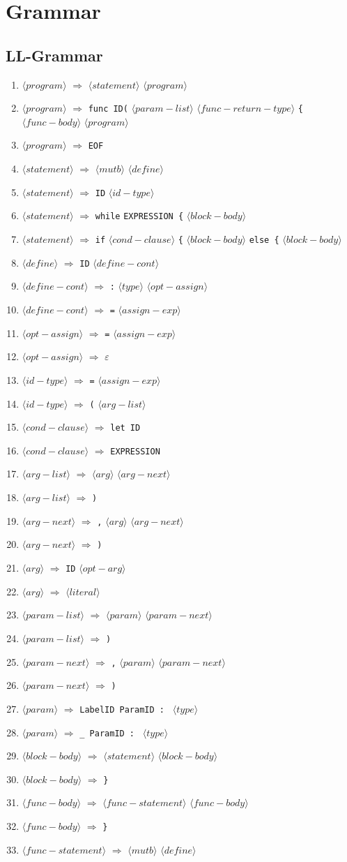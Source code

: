 \newcommand{\nonterm}[1]{$\langle #1 \rangle$}
\newcommand{\term}[1]{\texttt{#1}}
\newcommand{\RA}{$\Rightarrow$}
\newcommand{\newrule}[1]{\item \nonterm{#1} \RA}
\newcommand{\expr}{\term{EXPRESSION}}


\section{Grammar}
\subsection{LL-Grammar} \label{ll-grammar}

\begin{enumerate}
    \newrule{program} \nonterm{statement} \nonterm{program}
    \newrule{program} \term{func ID(} \nonterm{param-list} \nonterm{func-return-type} \term{\{} \nonterm{func-body} \nonterm{program}
    \newrule{program} \term{EOF}
    \newrule{statement} \nonterm{mutb} \nonterm{define}
    \newrule{statement} \term{ID} \nonterm{id-type}
    \newrule{statement} \term{while} \expr \term{ \{} \nonterm{block-body}
    \newrule{statement} \term{if} \nonterm{cond-clause} \term{\{} \nonterm{block-body} \term{else \{} \nonterm{block-body}
    \newrule{define} \term{ID} \nonterm{define-cont}
    \newrule{define-cont} \term{:} \nonterm{type} \nonterm{opt-assign}
    \newrule{define-cont} \term{=} \nonterm{assign-exp}
    \newrule{opt-assign} \term{=} \nonterm{assign-exp}
    \newrule{opt-assign} \term{$\varepsilon$}
    \newrule{id-type} \term{=} \nonterm{assign-exp}
    \newrule{id-type} \term{(} \nonterm{arg-list}
    \newrule{cond-clause} \term{let ID}
    \newrule{cond-clause} \expr
    \newrule{arg-list} \nonterm{arg} \nonterm{arg-next}
    \newrule{arg-list} \term{)}
    \newrule{arg-next} \term{,} \nonterm{arg} \nonterm{arg-next}
    \newrule{arg-next} \term{)}
    \newrule{arg} \term{ID} \nonterm{opt-arg}
    \newrule{arg} \nonterm{literal}
    \newrule{param-list} \nonterm{param} \nonterm{param-next}
    \newrule{param-list} \term{)}
    \newrule{param-next} \term{,} \nonterm{param} \nonterm{param-next}
    \newrule{param-next} \term{)}
    \newrule{param} \term{LabelID ParamID : } \nonterm{type}
    \newrule{param} \term{\_ ParamID : } \nonterm{type} 
    \newrule{block-body} \nonterm{statement} \nonterm{block-body}
    \newrule{block-body} \term{\}}
    \newrule{func-body} \nonterm{func-statement} \nonterm{func-body}
    \newrule{func-body} \term{\}}
    \newrule{func-statement} \nonterm{mutb} \nonterm{define}

\end{enumerate}
